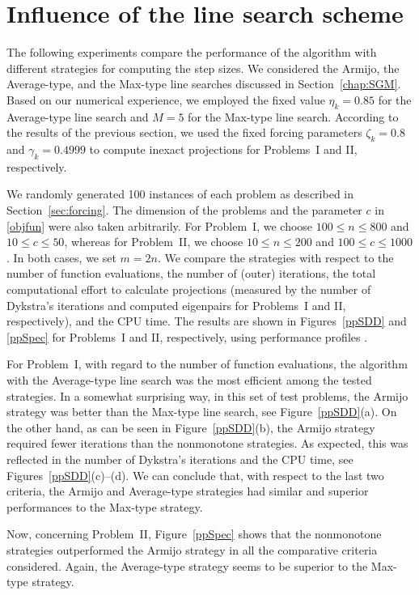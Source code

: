 \section{Influence of the line search scheme}

The following experiments compare the performance of the algorithm with different strategies for computing the step sizes. We considered the Armijo, the Average-type, and the Max-type line searches discussed in Section~\ref{chap:SGM}.
Based on our numerical experience, we employed the fixed value $\eta_k=0.85$ for the Average-type line search and $M=5$ for the Max-type line search.
According to the results of the previous section, we used the fixed forcing parameters $\zeta_k=0.8$ and $\gamma_k=0.4999$ to compute inexact projections for Problems~I and II, respectively.

We randomly generated 100 instances of each problem as described in Section~\ref{sec:forcing}. The dimension of the problems and the parameter $c$ in \eqref{objfun} were also taken arbitrarily. For Problem~I, we choose $100\leq n \leq 800$ and $10\leq c \leq 50$, whereas for Problem~II, we choose $10\leq n \leq 200$ and $100\leq c \leq 1000$. In both cases, we set $m=2n$.
We compare the strategies with respect to the number of function evaluations, the number of (outer) iterations, the total computational effort to calculate projections (measured by the number of Dykstra’s iterations and computed eigenpairs for Problems~I and II, respectively), and the CPU time. The results are shown in Figures~\ref{ppSDD} and \ref{ppSpec} for Problems~I and II, respectively, using performance profiles \cite{dolan2002benchmarking}.

For Problem~I, with regard to the number of function evaluations, the algorithm with the Average-type line search was the most efficient among the tested strategies.
In a somewhat surprising way, in this set of test problems, the Armijo strategy was better than the Max-type line search, see Figure~\ref{ppSDD}(a).
On the other hand, as can be seen in Figure~\ref{ppSDD}(b), the Armijo strategy required fewer iterations than the nonmonotone strategies.
As expected, this was reflected in the number of Dykstra’s iterations and the CPU time, see Figures~\ref{ppSDD}(c)--(d).
We can conclude that, with respect to the last two criteria, the Armijo and Average-type strategies had similar and superior performances to the Max-type strategy.

Now, concerning Problem~II, Figure~\ref{ppSpec} shows that the nonmonotone strategies outperformed the Armijo strategy in all the comparative criteria considered.
Again,  the Average-type strategy seems to be superior to the Max-type strategy.

